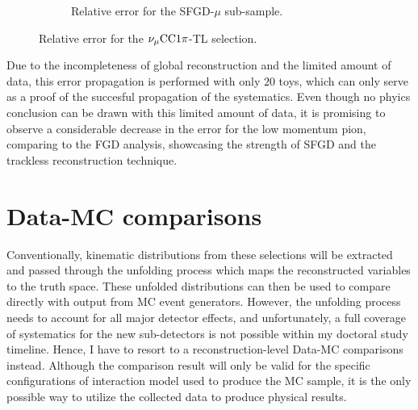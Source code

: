 \begin{figure}[h]
\begin{subfigure}[h]{\dbfigwid\textwidth}
          \caption{Relative error for the SFGD-$\mu$ sub-sample.}
          \label{subfig:relerr-sfgmu}
          \end{subfigure}
          \caption{Relative error for the $\nu_{\mu}\textrm{CC}1\pi$-TL selection.}
          \label{fig:tlpi-relerr}  
          \end{figure}
          Due to the incompleteness of global reconstruction and the limited amount of data, this error propagation is performed with only $20$ toys, which can only serve as a proof of the succesful propagation of the systematics.
          Even though no phyics conclusion can be drawn with this limited amount of data, it is promising to observe a considerable decrease in the error for the low momentum pion, comparing to the FGD analysis, showcasing the strength of SFGD and the trackless reconstruction technique.

     \section{Data-MC comparisons}
          Conventionally, kinematic distributions from these selections will be extracted and passed through the unfolding process which maps the reconstructed variables to the truth space. 
          These unfolded distributions can then be used to compare directly with output from MC event generators.
          However, the unfolding process needs to account for all major detector effects, and unfortunately, a full coverage of systematics for the new sub-detectors is not possible within my doctoral study timeline.
          Hence, I have to resort to a reconstruction-level Data-MC comparisons instead.
          Although the comparison result will only be valid for the specific configurations of interaction model used to produce the MC sample, it is the only possible way to utilize the collected data to produce physical results.
     
